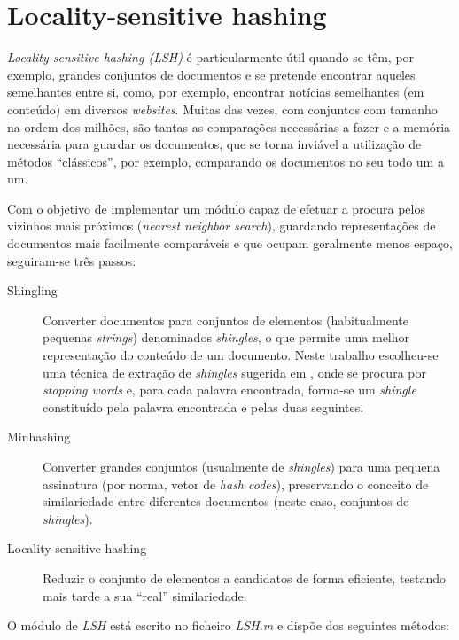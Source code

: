 \documentclass[a4paper,11pt,openright,oneside]{report}
\begin{document}
\chapter{Locality-sensitive hashing}
\label{chap.lsh}

\textit{Locality-sensitive hashing (LSH)} é particularmente útil quando se têm, por exemplo, grandes conjuntos de documentos e se pretende encontrar aqueles semelhantes entre si, como, por exemplo, encontrar notícias semelhantes (em conteúdo) em diversos \textit{websites}. Muitas das vezes, com conjuntos com tamanho na ordem dos milhões, são tantas as comparações necessárias a fazer e a memória necessária para guardar os documentos, que se torna inviável a utilização de métodos ``clássicos'', por exemplo, comparando os documentos no seu todo um a um.

Com o objetivo de implementar um módulo capaz de efetuar a procura pelos vizinhos mais próximos (\textit{nearest neighbor search}), guardando representações de documentos mais facilmente comparáveis e que ocupam geralmente menos espaço, seguiram-se três passos:

\begin{description}
\item[Shingling]
Converter documentos para conjuntos de elementos (habitualmente pequenas \textit{strings}) denominados \textit{shingles}, o que permite uma melhor representação do conteúdo de um documento. Neste trabalho escolheu-se uma técnica de extração de \textit{shingles} sugerida em \cite{book1}, onde se procura por \textit{stopping words} e, para cada palavra encontrada, forma-se um \textit{shingle} constituído pela palavra encontrada e pelas duas seguintes.
\item[Minhashing]
Converter grandes conjuntos (usualmente de \textit{shingles}) para uma pequena assinatura (por norma, vetor de \textit{hash codes}), preservando o conceito de similariedade entre diferentes documentos (neste caso, conjuntos de \textit{shingles}).
\item[Locality-sensitive hashing]
Reduzir o conjunto de elementos a candidatos de forma eficiente, testando mais tarde a sua ``real'' similariedade.
\end{description}

O módulo de \textit{LSH} está escrito no ficheiro \textit{LSH.m} e dispõe dos seguintes métodos:
\end{document}

